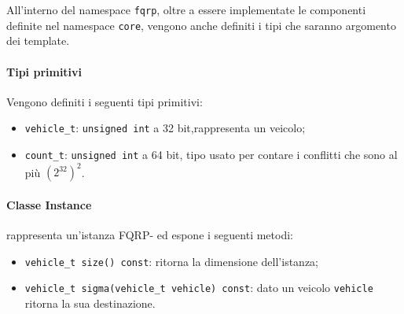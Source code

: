 \documentclass[../../../relazione.tex]{subfiles}
\begin{document}
All'interno del namespace \texttt{fqrp}, oltre a essere implementate le componenti definite nel namespace \texttt{core}, vengono anche definiti i tipi che saranno argomento dei template.

\paragraph{Tipi primitivi}
Vengono definiti i seguenti tipi primitivi:
\begin{itemize}
    \item \texttt{vehicle\_t}: \texttt{unsigned int} a 32 bit,rappresenta un veicolo;
    \item \texttt{count\_t}: \texttt{unsigned int} a 64 bit, tipo usato per contare i conflitti che sono al più $(2^{32})^2$.
\end{itemize}

\paragraph{Classe Instance} rappresenta un'istanza FQRP- ed espone i seguenti metodi:
\begin{itemize}
    \item \texttt{vehicle\_t size() const}: ritorna la dimensione dell'istanza;
    \item \texttt{vehicle\_t sigma(vehicle\_t vehicle) const}: dato un veicolo \texttt{vehicle} ritorna la sua destinazione.
\end{itemize}
\end{document}
